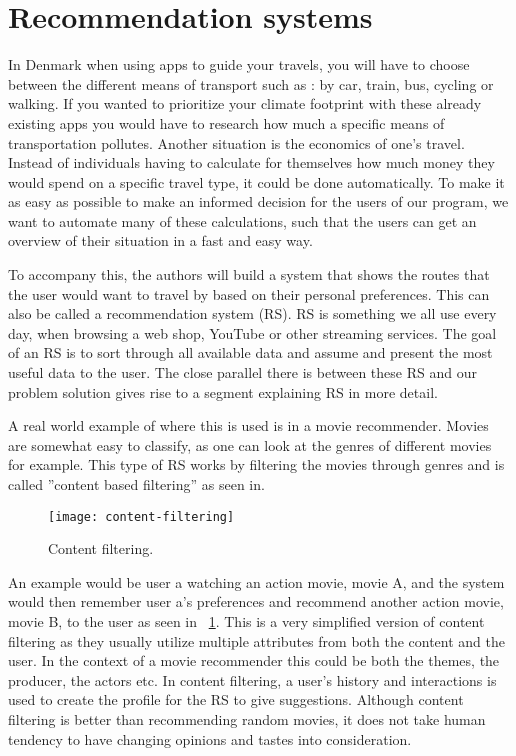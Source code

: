\section{Recommendation systems}\label{sec:recommendation-systems}

In Denmark when using apps to guide your travels, you will have to choose between the different means of transport such
as : by car, train, bus, cycling or walking.
If you wanted to prioritize your climate footprint with these already existing apps you would have to research how much
a specific means of transportation pollutes.
Another situation is the economics of one's travel.
Instead of individuals having to calculate for themselves how much money they would spend on a specific travel type,
it could be done automatically.
To make it as easy as possible to make an informed decision for the users of our program, we want to automate many of
these calculations, such that the users can get an overview of their situation in a fast and easy way.

To accompany this, the authors will build a system that shows the routes that the user would want to travel by based on
their personal preferences.
This can also be called a recommendation system (RS).
RS is something we all use every day, when browsing a web shop, YouTube or other streaming services.
The goal of an RS is to sort through all available data and assume and present the most useful data to the user.
The close parallel there is between these RS and our problem solution gives rise to a segment explaining RS in more
detail.

A real world example of where this is used is in a movie recommender.
Movies are somewhat easy to classify, as one can look at the genres of different movies for example.
This type of RS works by filtering the movies through genres and is called ''content based filtering'' as seen in.

\begin{figure}
    \centering
    \texttt{[image: content-filtering]}
    \caption{Content filtering.}
    \label{fig:figure3}
\end{figure}

An example would be user a watching an action movie, movie A, and the system would then remember user a's preferences
and recommend another action movie, movie B, to the user as seen in ~\ref{fig:figure3}.
This is a very simplified version of content filtering as they usually utilize multiple attributes from both the content
and the user.
In the context of a movie recommender this could be both the themes, the producer, the actors etc.
In content filtering, a user's history and interactions is used to create the profile for the RS to give suggestions.
Although content filtering is better than recommending random movies, it does not take human tendency to have changing
opinions and tastes into consideration.

